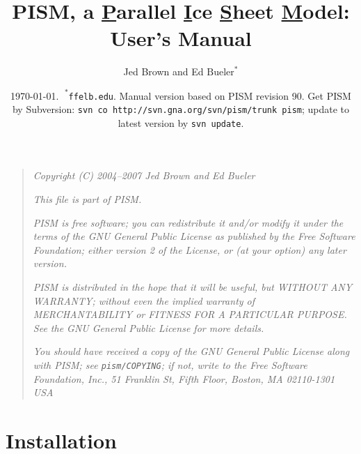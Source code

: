 \documentclass[11pt,final]{amsart}
\title[PISM User's Manual]{PISM, a \underline{P}arallel \underline{I}ce \underline{S}heet \underline{M}odel: \\ User's Manual}
\author{Jed Brown and Ed $\text{Bueler}^\ast$}
\date{\today.  $\phantom{|}^\ast$\texttt{ffelb\@@uaf.edu}.  Manual version based on PISM revision 90.  Get PISM by Subversion: \texttt{svn co http://svn.gna.org/svn/pism/trunk pism}; update to latest version by \texttt{svn update}.}
\newcommand{\normalspacing}{\renewcommand{\baselinestretch}{1.1}\tiny\normalsize}
\newcommand{\tablespacing}{\renewcommand{\baselinestretch}{1.0}\tiny\normalsize}
\begin{document}
\maketitle
\thispagestyle{empty}

\setcounter{tocdepth}{1}
\tableofcontents

\newpage
\phantom{bob}
\vspace{2in}
\begin{quote}
\textsl{Copyright (C) 2004--2007 Jed Brown and Ed Bueler}
\medskip

\noindent \textsl{This file is part of PISM.}
\medskip

\noindent \textsl{PISM is free software; you can redistribute it and/or modify it under the terms of the GNU General Public License as published by the Free Software Foundation; either version 2 of the License, or (at your option) any later version.}
\medskip

\noindent \textsl{PISM is distributed in the hope that it will be useful, but WITHOUT ANY WARRANTY; without even the implied warranty of MERCHANTABILITY or FITNESS FOR A PARTICULAR PURPOSE.  See the GNU General Public License for more details.}
\medskip

\noindent \textsl{You should have received a copy of the GNU General Public License along with PISM; see \emph{\texttt{pism/COPYING}}; if not, write to the Free Software Foundation, Inc., 51 Franklin St, Fifth Floor, Boston, MA  02110-1301 USA}
\end{quote}
\vspace{1in}
\normalspacing

\newpage
\section{Installation}
\end{document}

